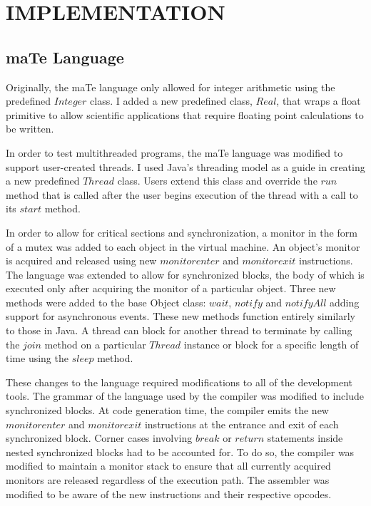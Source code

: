 \chapter{IMPLEMENTATION}
\label{IMPLEMENTATION}

\section{maTe Language}

Originally, the maTe language only allowed for integer arithmetic
using the predefined $Integer$ class.  I added a new predefined class,
$Real$, that wraps a float primitive to allow scientific applications
that require floating point calculations to be written.

In order to test multithreaded programs, the maTe language was
modified to support user-created threads.  I used Java's threading
model as a guide in creating a new predefined $Thread$ class.  Users
extend this class and override the $run$ method that is called after
the user begins execution of the thread with a call to its $start$
method.

In order to allow for critical sections and synchronization, a monitor
in the form of a mutex was added to each object in the virtual
machine.  An object's monitor is acquired and released using new
$monitorenter$ and $monitorexit$ instructions.  The language was
extended to allow for synchronized blocks, the body of which is
executed only after acquiring the monitor of a particular object.
Three new methods were added to the base Object class: $wait$,
$notify$ and $notifyAll$ adding support for asynchronous events.
These new methods function entirely similarly to those in Java.  A
thread can block for another thread to terminate by calling the $join$
method on a particular $Thread$ instance or block for a specific
length of time using the $sleep$ method.

These changes to the language required modifications to all of the
development tools.  The grammar of the language used by the compiler
was modified to include synchronized blocks.  At code generation time,
the compiler emits the new $monitorenter$ and $monitorexit$
instructions at the entrance and exit of each synchronized block.
Corner cases involving $break$ or $return$ statements inside nested
synchronized blocks had to be accounted for.  To do so, the compiler
was modified to maintain a monitor stack to ensure that all currently
acquired monitors are released regardless of the execution path.  The
assembler was modified to be aware of the new instructions and their
respective opcodes.

